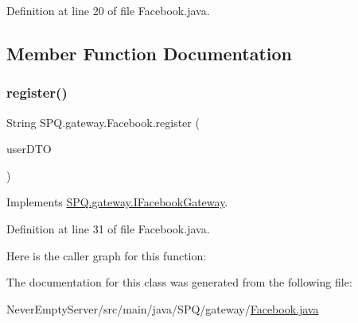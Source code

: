 Definition at line 20 of file Facebook.\+java.



\subsection{Member Function Documentation}
\mbox{\label{class_s_p_q_1_1gateway_1_1_facebook_aba03bc89c530d3f2159b3a1eb65c3427}} 
\subsubsection{\texorpdfstring{register()}{register()}}
{\footnotesize\ttfamily String S\+P\+Q.\+gateway.\+Facebook.\+register (\begin{DoxyParamCaption}\item[{\mbox{\hyperlink{class_s_p_q_1_1dto_1_1_user_d_t_o}{User\+D\+TO}}}]{user\+D\+TO }\end{DoxyParamCaption})}



Implements \mbox{\hyperlink{interface_s_p_q_1_1gateway_1_1_i_facebook_gateway_adeef42315d68dc80ddf79bf4e1cbdeb0}{S\+P\+Q.\+gateway.\+I\+Facebook\+Gateway}}.



Definition at line 31 of file Facebook.\+java.

Here is the caller graph for this function\+:


The documentation for this class was generated from the following file\+:\begin{DoxyCompactItemize}
\item 
Never\+Empty\+Server/src/main/java/\+S\+P\+Q/gateway/\mbox{\hyperlink{_facebook_8java}{Facebook.\+java}}\end{DoxyCompactItemize}
